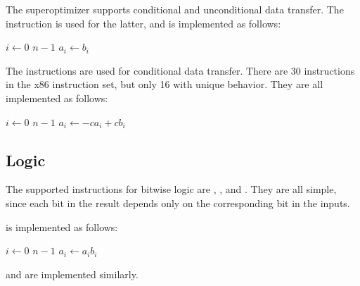\documentclass[a4paper,11pt]{kth-mag}
\renewcommand{\gets}{\leftarrow}
\newcommand{\AND}{}
\newcommand{\IOR}{+}
\newcommand{\NOT}{-}
\begin{document}
The superoptimizer supports conditional and unconditional data transfer.
The  instruction is used for the latter, and is implemented as follows:

\begin{codebox}
\zi \For $i \gets 0$ \To $n-1$
\zi \Do
      $a_i \gets b_i$
    \End
\end{codebox}

The  instructions are used for conditional data transfer.
There are 30  instructions in the x86 instruction set, but only 16 with unique behavior.
They are all implemented as follows:

\begin{codebox}
\zi \For $i \gets 0$ \To $n-1$
\zi \Do
      $a_i \gets \NOT c \AND a_i \IOR c \AND b_i$
    \End
\end{codebox}




\subsection{Logic}

The supported instructions for bitwise logic are , ,  and .
They are all simple, since each bit in the result depends only on the corresponding bit in the inputs.

 is implemented as follows:

\begin{codebox}
\zi \For $i \gets 0$ \To $n-1$
\zi \Do
      $a_i \gets a_i \AND b_i$
    \End
\end{codebox}

 and  are implemented similarly.
\end{document}
